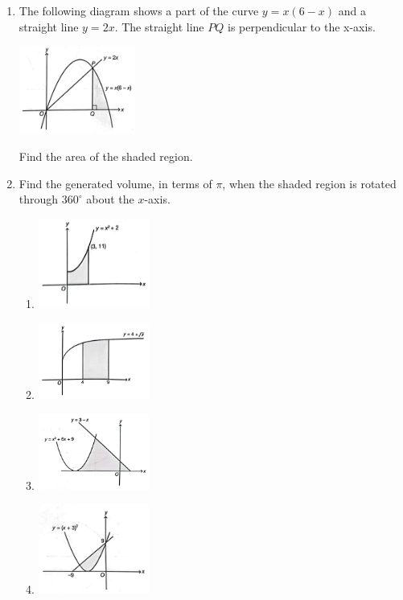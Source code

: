 \documentclass{report}
\begin{document}
\begin{multicols*}{2}
\begin{enumerate}
            \item The following diagram shows a part of the curve $y = x(6-x)$ and a straight
                  line $y = 2x$. The straight line $PQ$ is perpendicular to the x-axis.
                  \begin{center}
                        \includegraphics[width=0.3\textwidth,valign=t]{./images/14.png}
                  \end{center}
                  Find the area of the shaded region.

            \item Find the generated volume, in terms of $\pi$, when the shaded region is rotated
                  through $360^{\circ}$ about the $x$-axis.
                  \begin{enumerate}
                        \item \includegraphics[width=0.3\textwidth,valign=t]{./images/15.png}
                        \item \includegraphics[width=0.3\textwidth,valign=t]{./images/16.png}
                        \item \includegraphics[width=0.3\textwidth,valign=t]{./images/17.png}
                        \item \includegraphics[width=0.3\textwidth,valign=t]{./images/18.png}
                  \end{enumerate}


\end{enumerate}
\end{multicols*}
\end{document}

